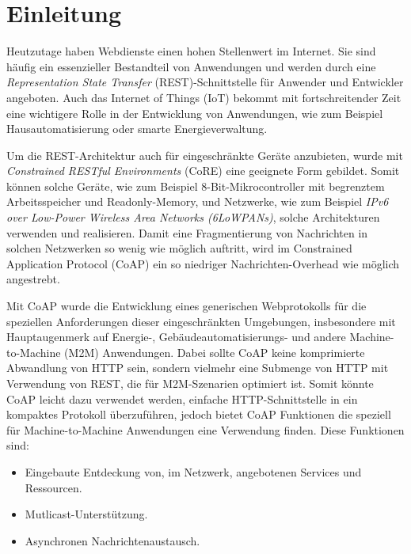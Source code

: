 \section{Einleitung}
\label{sec:einleitung}

Heutzutage haben Webdienste einen hohen Stellenwert im Internet. Sie sind häufig ein essenzieller Bestandteil von Anwendungen und werden durch eine \textit{Representation State Transfer} (REST)-Schnittstelle für Anwender und Entwickler angeboten. Auch das Internet of Things (IoT) bekommt mit fortschreitender Zeit eine wichtigere Rolle in der Entwicklung von Anwendungen, wie zum Beispiel Hausautomatisierung oder smarte Energieverwaltung.

Um die REST-Architektur auch für eingeschränkte Geräte anzubieten, wurde mit \textit{Constrained RESTful Environments} (CoRE) eine geeignete Form gebildet. Somit können solche Geräte, wie zum Beispiel 8-Bit-Mikrocontroller mit begrenztem Arbeitsspeicher und Readonly-Memory, und Netzwerke, wie zum Beispiel \textit{IPv6 over Low-Power Wireless Area Networks (6LoWPANs)}, solche Architekturen verwenden und realisieren. Damit eine Fragmentierung von Nachrichten in solchen Netzwerken so wenig wie möglich auftritt, wird im Constrained Application Protocol (CoAP) ein so niedriger Nachrichten-Overhead wie möglich angestrebt.

Mit CoAP wurde die Entwicklung eines generischen Webprotokolls für die speziellen Anforderungen dieser eingeschränkten Umgebungen, insbesondere mit Hauptaugenmerk auf Energie-, Gebäudeautomatisierungs- und andere Machine-to-Machine (M2M) Anwendungen. Dabei sollte CoAP keine komprimierte Abwandlung von HTTP sein, sondern vielmehr eine Submenge von HTTP mit Verwendung von REST, die für M2M-Szenarien optimiert ist. Somit könnte CoAP leicht dazu verwendet werden, einfache HTTP-Schnittstelle in ein kompaktes Protokoll überzuführen, jedoch bietet CoAP Funktionen die speziell für Machine-to-Machine Anwendungen eine Verwendung finden. Diese Funktionen sind:
\begin{itemize}
    \item Eingebaute Entdeckung von, im Netzwerk, angebotenen Services und Ressourcen.
    \item Mutlicast-Unterstützung.
    \item Asynchronen Nachrichtenaustausch.
\end{itemize}

